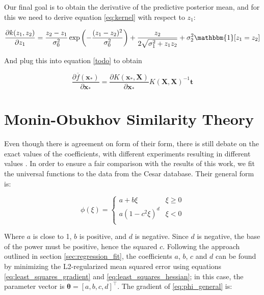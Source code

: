 \documentclass[12pt]{book}
\begin{document}
Our final goal is to obtain the derivative of the predictive posterior mean, and for this we need to derive equation \ref{eq:kernel} with respect to $z_1$:

\begin{equation}
\label{eq:kernel_derivative}
\frac{\partial k(z_1,z_2)}{\partial z_1}=\frac{z_2-z_1}{\sigma_0^2}\exp\left(-\frac{(z_1-z_2)^2}{\sigma_0^2}\right)+\frac{z_2}{2\sqrt{\sigma_1^2+z_1z_2}}+\sigma_2^2\mathbbm{1}[z_1=z_2]
\end{equation}

And plug this into equation \ref{todo} to obtain

\begin{equation}
\label{eq:gp_gradient}
\frac{\partial\overline{f}(\bm x_*)}{\partial\bm x_*}=\frac{\partial K(\bm x_*,\bm X)}{\partial\bm x_*}K(\bm X,\bm X)^{-1}\bm t
\end{equation}

\section{Monin-Obukhov Similarity Theory}
\label{sec:most_fit}

Even though there is agreement on form of their form, there is still debate on the exact values of the coefficients, with different experiments resulting in different values \citep{hogstrom88}. In order to ensure a fair comparison with the results of this work, we fit the universal functions to the data from the Cesar database. Their general form is:

\begin{equation}
\label{eq:phi_general}
\phi(\xi)=\begin{cases}
a+b\xi & \xi\geq 0 \\
a(1-c^2\xi)^d & \xi<0 \\
\end{cases}
\end{equation}

Where $a$ is close to 1, $b$ is positive, and $d$ is negative. Since $d$ is negative, the base of the power must be positive, hence the squared $c$. Following the approach outlined in section \ref{sec:regression_fit}, the coefficients $a$, $b$, $c$ and $d$ can be found by minimizing the L2-regularized mean squared error using equations \ref{eq:least_squares_gradient} and \ref{eq:least_squares_hessian}; in this case, the parameter vector is $\bm\theta=\left[a,b,c,d\right]^\intercal$. The gradient of \ref{eq:phi_general} is:
\end{document}

